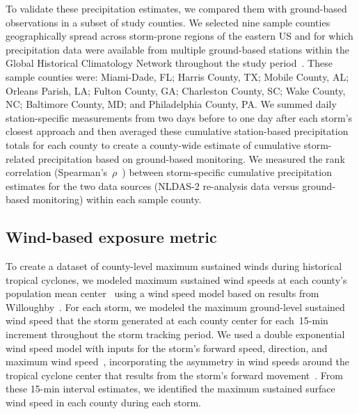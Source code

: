 To validate these precipitation estimates, we compared them with ground-based
observations in a subset of study counties. We selected nine sample counties
geographically spread across storm-prone regions of the eastern \ac{US} and for
which precipitation data were available from multiple ground-based stations
within the Global Historical Climatology Network throughout the study
period~\parencite{menne2012overview, rnoaa, countyweather}. These sample
counties were: Miami-Dade, FL; Harris County, TX; Mobile County, AL; Orleans
Parish, LA; Fulton County, GA; Charleston County, SC; Wake County, NC;
Baltimore County, MD; and Philadelphia County, PA. We summed daily
station-specific measurements from two days before to one day after each
storm's closest approach and then averaged these cumulative station-based
precipitation totals for each county to create a county-wide estimate of
cumulative storm-related precipitation based on ground-based monitoring. We
measured the rank correlation (Spearman's~$\rho$~\parencite{spearman1904proof})
between storm-specific cumulative precipitation estimates for the two data
sources (\ac{NLDAS-2} re-analysis data versus ground-based monitoring) within
each sample county.

\subsection*{Wind-based exposure metric}

To create a dataset of county-level maximum sustained winds during historical
tropical cyclones, we modeled maximum sustained wind speeds at each county's
population mean center~\parencite{countycenters} using a wind speed model based
on results from Willoughby~\parencite{willoughby2006parametric}. For each
storm, we modeled the maximum ground-level sustained wind speed that the storm
generated at each county center for each~15-\si{\minute} increment throughout
the storm tracking period. We used a double exponential wind speed model with
inputs for the storm's forward speed, direction, and maximum wind
speed~\parencite{willoughby2006parametric, stormwindmodel}, incorporating the
asymmetry in wind speeds around the tropical cyclone center that results from
the storm's forward movement~\parencite{phadke2003modeling}. From these
15-\si{\minute} interval estimates, we identified the maximum sustained surface
wind speed in each county during each storm.

